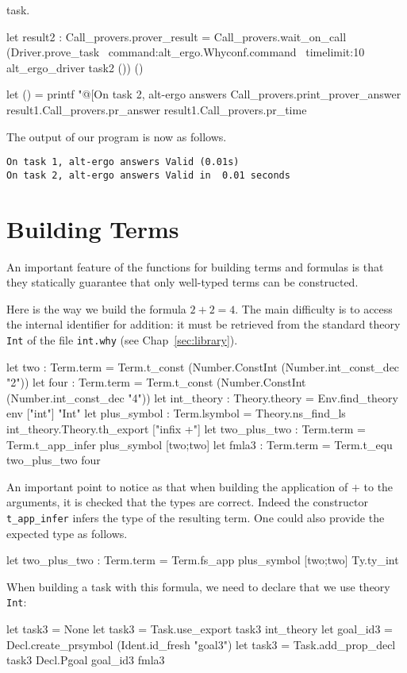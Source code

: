 task.
\begin{ocamlcode}
let result2 : Call_provers.prover_result =
   Call_provers.wait_on_call
    (Driver.prove_task ~command:alt_ergo.Whyconf.command
    ~timelimit:10
    alt_ergo_driver task2 ()) ()

let () =
  printf "@[On task 2, alt-ergo answers %
    Call_provers.print_prover_answer
    result1.Call_provers.pr_answer
    result1.Call_provers.pr_time
\end{ocamlcode}
The output of our program is now as follows.
\begin{verbatim}
On task 1, alt-ergo answers Valid (0.01s)
On task 2, alt-ergo answers Valid in  0.01 seconds
\end{verbatim}

\section{Building Terms}

An important feature of the functions for building terms and formulas
is that they statically guarantee that only well-typed terms can be
constructed.

Here is the way we build the formula $2+2=4$. The main difficulty is to
access the internal identifier for addition: it must be retrieved from
the standard theory \texttt{Int} of the file \texttt{int.why} (see
Chap~\ref{sec:library}).
\begin{ocamlcode}
let two : Term.term = 
  Term.t_const (Number.ConstInt (Number.int_const_dec "2"))
let four : Term.term = 
  Term.t_const (Number.ConstInt (Number.int_const_dec "4"))
let int_theory : Theory.theory =
  Env.find_theory env ["int"] "Int"
let plus_symbol : Term.lsymbol =
  Theory.ns_find_ls int_theory.Theory.th_export ["infix +"]
let two_plus_two : Term.term =
  Term.t_app_infer plus_symbol [two;two]
let fmla3 : Term.term = Term.t_equ two_plus_two four
\end{ocamlcode}
An important point to notice as that when building the application of
$+$ to the arguments, it is checked that the types are correct. Indeed
the constructor \texttt{t\_app\_infer} infers the type of the resulting
term. One could also provide the expected type as follows.
\begin{ocamlcode}
let two_plus_two : Term.term =
  Term.fs_app plus_symbol [two;two] Ty.ty_int
\end{ocamlcode}

When building a task with this formula, we need to declare that we use
theory \texttt{Int}:
\begin{ocamlcode}
let task3 = None
let task3 = Task.use_export task3 int_theory
let goal_id3 = Decl.create_prsymbol (Ident.id_fresh "goal3")
let task3 = Task.add_prop_decl task3 Decl.Pgoal goal_id3 fmla3
\end{ocamlcode}

